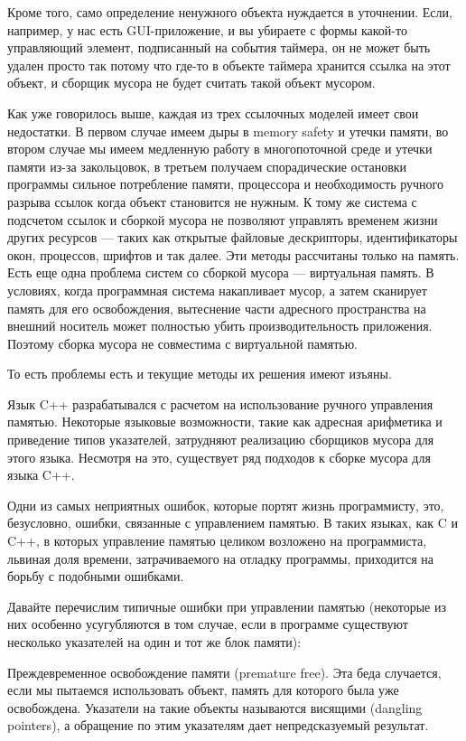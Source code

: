 Кроме того, само определение ненужного объекта нуждается в уточнении. Если, например, у нас есть GUI-приложение, и вы убираете с формы какой-то управляющий элемент, подписанный на события таймера, он не может быть удален просто так потому что где-то в объекте таймера хранится ссылка на этот объект, и сборщик мусора не будет считать такой объект мусором.

Как уже говорилось выше, каждая из трех ссылочных моделей имеет свои недостатки. В первом случае имеем дыры в memory safety и  утечки памяти, во втором случае мы имеем медленную работу в многопоточной среде и утечки памяти из-за закольцовок, в третьем получаем спорадические остановки программы сильное потребление памяти, процессора и необходимость ручного разрыва ссылок когда объект становится не нужным. К тому же система с подсчетом ссылок и сборкой мусора не позволяют управлять временем жизни других ресурсов — таких как открытые файловые дескрипторы, идентификаторы окон, процессов, шрифтов и так далее. Эти методы рассчитаны только на память. Есть еще одна проблема систем со сборкой мусора — виртуальная память. В условиях, когда программная система накапливает мусор, а затем сканирует память для его освобождения, вытеснение части адресного пространства на внешний носитель может полностью убить производительность приложения. Поэтому сборка мусора не совместима с виртуальной памятью.

То есть проблемы есть и текущие методы их решения имеют изъяны.



Язык C++ разрабатывался с расчетом на использование ручного управления памятью. Некоторые
языковые возможности, такие как адресная арифметика и приведение
типов указателей, затрудняют реализацию сборщиков мусора для этого
языка. Несмотря на это, существует ряд подходов к сборке мусора для
языка C++.



Одни из самых неприятных ошибок, которые портят жизнь программисту, это, безусловно, ошибки, связанные с управлением памятью. В таких языках, как C и C++, в которых управление памятью целиком возложено на программиста, львиная доля времени, затрачиваемого на отладку программы, приходится на борьбу с подобными ошибками.

Давайте перечислим типичные ошибки при управлении памятью (некоторые из них особенно усугубляются в том случае, если в программе существуют несколько указателей на один и тот же блок памяти):

Преждевременное освобождение памяти (premature free). Эта беда случается, если мы пытаемся использовать объект, память для которого была уже освобождена. Указатели на такие объекты называются висящими (dangling pointers), а обращение по этим указателям дает непредсказуемый результат.

